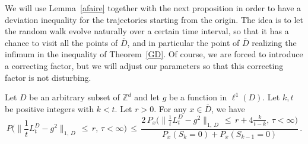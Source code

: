 \documentclass[AHL, Unicode, longabstracts, published]{cedram}
\newcommand*\bD{\overline{D}}
\newcommand*\Zd {{\mathbb Z^d}}
\begin{document}
We will use Lemma~\ref{afaire} together with the next proposition in order to have a deviation inequality for the trajectories starting from the origin. The idea is to let the random walk evolve naturally over a certain time interval, so that it has a chance to visit all the points of $\bD$, and in particular the point of $\bD$ realizing the infimum in the inequality of Theorem~\ref{GD}. Of course, we are forced to introduce a correcting factor, but we will adjust our parameters so that this correcting factor is not disturbing.
\begin{prop}\label{depe}
Let $D$ be an arbitrary subset of $\Zd$ and let $g$ be a function in $\ell^{1}(D)$. Let $k,t$ be positive integers with $k<t$. Let $r>0$. For any $x\in\bD$, we have
\begin{equation*}
P\Big(
\Big\|\frac{1}{t}L_t^D-g^2
\Big\|_{1,\,D}\,\leq\,r,\,\tau<\infty
\Big)\,\leq\,
\frac{\displaystyle 2\, P_x\Big(
\Big\|\frac{1}{t}L_t^D-g^2
\Big\|_{1,\,D}\,\leq\,r +4\frac{k}{t-k},\,\tau<\infty
\Big)} {\displaystyle P_x(S_{k}=0)+ P_x(S_{k-1}=0)}\,.
\end{equation*}
\end{prop}
\end{document}
